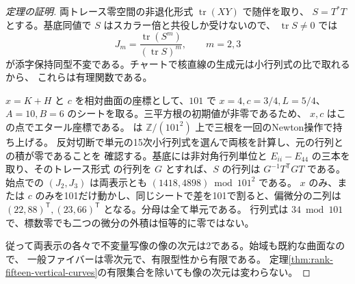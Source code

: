 \begin{proof}[定理の証明]
両トレース零空間の非退化形式 $\operatorname{tr}(XY)$ で随伴を取り、
$S=T^*T$ とする。基底同値で $S$ はスカラー倍と共役しか受けないので、
$\operatorname{tr}S\ne0$ では
\[
 J_m=\frac{\operatorname{tr}(S^m)}{(\operatorname{tr}S)^m},\qquad m=2,3
\]
が添字保持同型不変である。チャートで核直線の生成元は小行列式の比で取れるから、
これらは有理関数である。

$x=K+H$ と $c$ を相対曲面の座標として、$101$ で $x=4,c=3/4,L=5/4$、
$A=10,B=6$ のシートを取る。三平方根の初期値が非零であるため、
$x,c$ はこの点でエタール座標である。
 は
$\mathbb Z/(101^2)$ 上で三根を一回のNewton操作で持ち上げる。
反対切断で単元の15次小行列式を選んで両核を計算し、元の行列との積が零であることを
確認する。基底には非対角行列単位と $E_{ii}-E_{44}$ の三本を取り、そのトレース形式
の行列を $G$ とすれば、$S$ の行列は $G^{-1}T^{\mathsf T}GT$ である。
始点での $(J_2,J_3)$ は両表示とも $(1418,4898)\bmod 101^2$ である。
$x$ のみ、または $c$ のみを101だけ動かし、同じシートで差を101で割ると、偏微分の二列は
$(22,88)^{\mathsf T},(23,66)^{\mathsf T}$ となる。分母は全て単元である。
行列式は $34\bmod101$ で、標数零でも二つの微分の外積は恒等的に零ではない。

従って両表示の各々で不変量写像の像の次元は2である。始域も既約な曲面なので、
一般ファイバーは零次元で、有限型性から有限である。
定理\ref{thm:rank-fifteen-vertical-curves}の有限集合を除いても像の次元は変わらない。
\end{proof}
